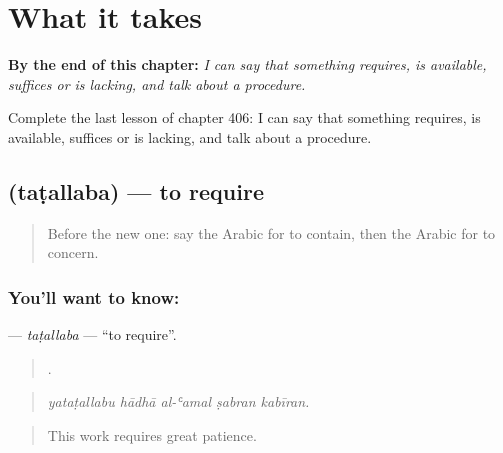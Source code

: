 
\chapter{What it takes}
\label{ch:ar-what-it-takes}

\begin{chapteropening}
\textbf{By the end of this chapter:} \emph{I can say that something requires, is available, suffices or is lacking, and talk about a procedure.}

Complete the last lesson of chapter 406: I can say that something requires, is available, suffices or is lacking, and talk about a procedure.
\end{chapteropening}

\section[\texorpdfstring{\ar{تطلب} (taṭallaba)}{تطلب (taṭallaba)}]{ (taṭallaba) — to require}

\label{lesson:AR-C406-tatallaba}



\begin{quote}
Before the new one: say the Arabic for to contain, then the Arabic for to concern.
\end{quote}

\subsection*{You'll want to know: }
\textbf{} — \emph{taṭallaba} — \textquotedblleft{}to require\textquotedblright{}.

\begin{quote}
    .
\end{quote}

\begin{quote}
\emph{yataṭallabu hādhā al-ʿamal ṣabran kabīran.}
\end{quote}

\begin{quote}
This work requires great patience.
\end{quote}

